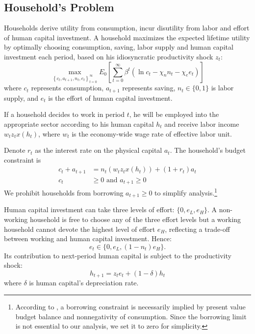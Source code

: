 \documentclass[12pt]{article}
\begin{document}
\subsection{Household's Problem}
Households derive utility from consumption, incur disutility from labor and effort of human capital investment. 
A household maximizes the expected lifetime utility by optimally choosing consumption, saving, labor supply and human capital investment each period, based on his idiosyncratic productivity shock $z_t$:
\begin{equation}
\max_{\left \{ c_t,a_{t+1},n_t,e_t\right \}_{t=0}^{\infty }}E_0\left[
\sum\limits_{t=0}^{\infty }\beta^t( \ln c_t-\chi_n n_t-\chi_e e_t ) \right] 
\end{equation}
where $c_t$ represents consumption, $a_{t+1}$ represents saving, $n_t \in \{0,1\}$ is labor supply, and $e_t$ is the effort of human capital investment.

If a household decides to work in period $t$, he will be employed into the appropriate sector according to his human capital $h_t$ and receive labor income $w_tz_tx(h_t)$, where $w_t$ is the economy-wide wage rate of effective labor unit.

Denote $r_t$ as the interest rate on the physical capital $a_t$. The household's budget constraint is
\begin{align}
    c_t+a_{t+1}&=n_t( w_tz_tx(h_t))+(1+r_t)a_t \\
    c_t& \geq 0 \text{ and } a_{t+1} \geq 0
\end{align}
We prohibit households from borrowing $a_{t+1} \geq 0$ to simplify analysis.\footnote{According to \citet{aiyagari_uninsured_1994}, a borrowing constraint is necessarily implied by present value budget balance and nonnegativity of consumption. Since the borrowing limit is not essential to our analysis, we set it to zero for simplicity.} 

Human capital investment can take three levels of effort: $\{0,e_L,e_H\}$. A non-working household is free to choose any of the three effort levels but a working household cannot devote the highest level of effort $e_H$, reflecting a trade-off between working and human capital investment. Hence:
\begin{equation}
e_t \in \{0, e_L, (1-n_t)e_H\}.
\end{equation}
Its contribution to next-period human capital is subject to the productivity shock:
\begin{equation}
h_{t+1}=z_te_t + (1-\delta)h_t
\end{equation}
where $\delta$ is human capital's depreciation rate. 
 
\end{document}
